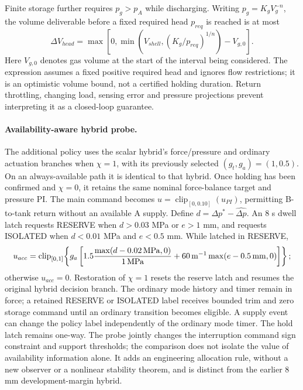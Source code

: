 Finite storage further requires $p_g>p_A$ while discharging. Writing $p_g=K_g V_g^{-n}$, the volume deliverable before a fixed required head $p_{req}$ is reached is at most
\begin{equation}
 \Delta V_{head}=\max\!\left[0,\min\!\left(V_{shell},
 (K_g/p_{req})^{1/n}\right)-V_{g,0}\right].\label{eq:reserve-head}
\end{equation}
Here $V_{g,0}$ denotes gas volume at the start of the interval being considered. The expression assumes a fixed positive required head and ignores flow restrictions; it is an optimistic volume bound, not a certified holding duration. Return throttling, changing load, sensing error and pressure projections prevent interpreting it as a closed-loop guarantee.

\paragraph{Availability-aware hybrid probe.}
The additional policy uses the scalar hybrid's force/pressure and ordinary actuation branches when $\chi=1$, with its previously selected $(g_t,g_a)=(1,0.5)$. On an always-available path it is identical to that hybrid. Once holding has been confirmed and $\chi=0$, it retains the same nominal force-balance target and pressure PI. The main command becomes $u=\operatorname{clip}_{[0,0.10]}(u_{PI})$, permitting B-to-tank return without an available A supply. Define $d=\Delta p^*-\widehat{\Delta p}$. An 8 s dwell latch requests RESERVE when $d>0.03$ MPa or $e>1$ mm, and requests ISOLATED when $d<0.01$ MPa and $e<0.5$ mm. While latched in RESERVE,
\begin{equation}
 u_{acc}=\operatorname{clip}_{[0,1]}\!\left\{
 g_a\left[1.5\frac{\max(d-0.02\,{\rm MPa},0)}{1\,{\rm MPa}}
       +60\,{\rm m}^{-1}\max(e-0.5\,{\rm mm},0)\right]\right\};\label{eq:reserve-control}
\end{equation}
otherwise $u_{acc}=0$. Restoration of $\chi=1$ resets the reserve latch and resumes the original hybrid decision branch. The ordinary mode history and timer remain in force; a retained RESERVE or ISOLATED label receives bounded trim and zero storage command until an ordinary transition becomes eligible. A supply event can change the policy label independently of the ordinary mode timer. The hold latch remains one-way. The probe jointly changes the interruption command sign constraint and support thresholds; the comparison does not isolate the value of availability information alone. It adds an engineering allocation rule, without a new observer or a nonlinear stability theorem, and is distinct from the earlier 8 mm development-margin hybrid.

